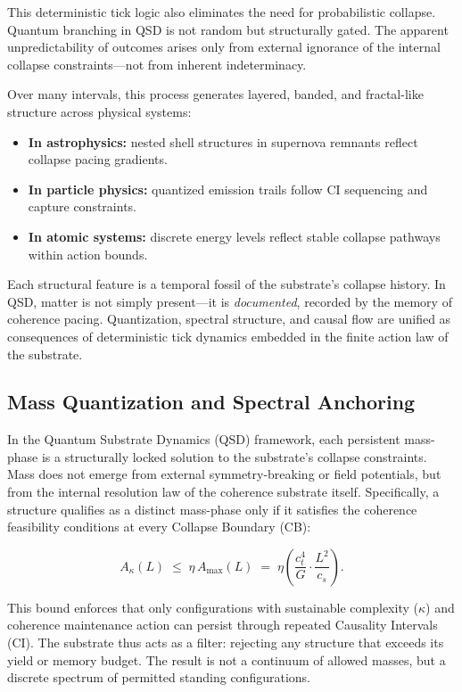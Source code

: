 \documentclass[preprints,article,submit,pdftex,moreauthors]{Definitions/mdpi}
\begin{document}
This deterministic tick logic also eliminates the need for probabilistic collapse. Quantum branching in QSD is not random but structurally gated. The apparent unpredictability of outcomes arises only from external ignorance of the internal collapse constraints—not from inherent indeterminacy.

Over many intervals, this process generates layered, banded, and fractal-like structure across physical systems:
\begin{itemize}
    \item \textbf{In astrophysics:} nested shell structures in supernova remnants reflect collapse pacing gradients.
    \item \textbf{In particle physics:} quantized emission trails follow CI sequencing and capture constraints.
    \item \textbf{In atomic systems:} discrete energy levels reflect stable collapse pathways within action bounds.
\end{itemize}

Each structural feature is a temporal fossil of the substrate's collapse history. In QSD, matter is not simply present—it is \emph{documented}, recorded by the memory of coherence pacing. Quantization, spectral structure, and causal flow are unified as consequences of deterministic tick dynamics embedded in the finite action law of the substrate.


\subsection{Mass Quantization and Spectral Anchoring}

In the Quantum Substrate Dynamics (QSD) framework, each persistent mass-phase is a structurally locked solution to the substrate’s collapse constraints. Mass does not emerge from external symmetry-breaking or field potentials, but from the internal resolution law of the coherence substrate itself. Specifically, a structure qualifies as a distinct mass-phase only if it satisfies the coherence feasibility conditions at every Collapse Boundary (CB):

\[
A_\kappa(L) \;\leq\; \eta\,A_{\max}(L) \;=\; \eta \left( \frac{c_t^4}{G} \cdot \frac{L^2}{c_s} \right).
\]

This bound enforces that only configurations with sustainable complexity (\( \kappa \)) and coherence maintenance action can persist through repeated Causality Intervals (CI). The substrate thus acts as a filter: rejecting any structure that exceeds its yield or memory budget. The result is not a continuum of allowed masses, but a discrete spectrum of permitted standing configurations.
\end{document}
